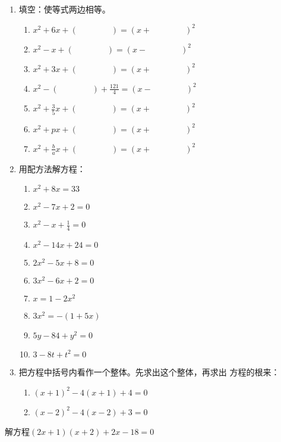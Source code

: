 \begin{ex}
\begin{enumerate}
    \item 填空：使等式两边相等。
\begin{enumerate}
    \item $x^2+6x+(\qquad \qquad  )=(x+ \qquad \qquad )^2$
    \item $x^2-x+(\qquad \qquad  )=(x- \qquad \qquad )^2$
    \item $x^2+3x+(\qquad \qquad  )=(x+ \qquad \qquad )^2$
    \item $x^2-(\qquad \qquad )+\frac{121}{4}=(x-\qquad \qquad )^2$
    \item $x^2+\frac{3}{5}x+(\qquad \qquad )=(x+\qquad \qquad )^2$
     \item $x^2+px+(\qquad \qquad  )=(x+\qquad \qquad )^2$
     \item $x^2+\frac{b}{a}x+(\qquad \qquad )=(x+\qquad \qquad )^2$
\end{enumerate}

\item 用配方法解方程：
\begin{multicols}{2}
    \begin{enumerate}
\item $x^2+8x=33$
\item $x^2-7x+2=0$
\item $x^2-x+\frac{1}{4}=0$
\item $x^2-14x+24=0$
\item $2x^2-5x+8=0$
\item $3x^2-6x+2=0$
\item $x=1-2x^2$
\item $3x^2=-(1+5x)$
\item $5y-84+y^2=0$
\item $3-8t+t^2=0$
\end{enumerate}
\end{multicols}


\item 把方程中括号内看作一个整体。先求出这个整体，再求出
方程的根来：
\begin{enumerate}
    \item $(x+1)^2-4(x+1)+4=0$
    \item $(x-2)^2-4(x-2)+3=0$
\end{enumerate}
\end{enumerate}
\end{ex}




\begin{example}
    解方程$(2x+1)(x+2)+2x-18=0$
\end{example}



